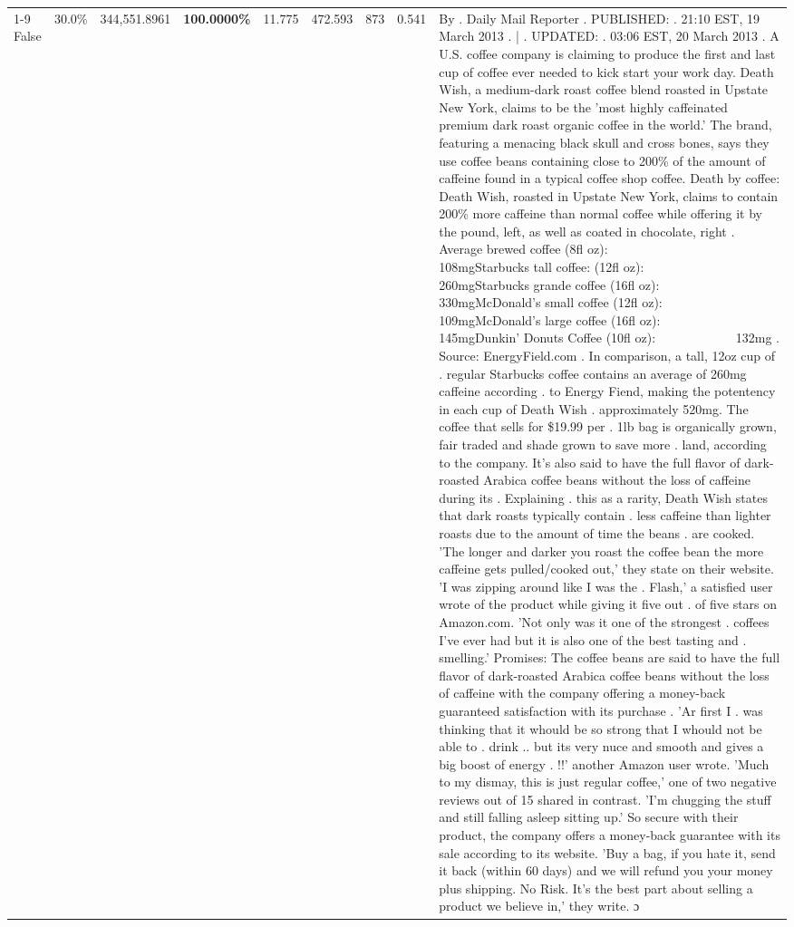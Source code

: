 \begin{table}[H]
{\begin{tabular}{lllrlllll}
\cline{1-9}
False & 30.0\% & 344,551.8961 & \bfseries \color{red} 100.0000\% & 11.775 & 472.593 & 873 & 0.541 & By . Daily Mail Reporter . PUBLISHED: . 21:10 EST, 19 March 2013 . | . UPDATED: . 03:06 EST, 20 March 2013 . A U.S. coffee company is claiming to produce the first and last cup of coffee ever needed to kick start your work day. Death Wish, a medium-dark roast coffee blend roasted in Upstate New York, claims to be the 'most highly caffeinated premium dark roast organic coffee in the world.' The brand, featuring a menacing black skull and cross bones, says they use coffee beans containing close to 200\% of the amount of caffeine found in a typical coffee shop coffee. Death by coffee: Death Wish, roasted in Upstate New York, claims to contain 200\% more caffeine than normal coffee while offering it by the pound, left, as well as coated in chocolate, right . Average brewed coffee (8fl oz):              108mgStarbucks tall coffee: (12fl oz):                260mgStarbucks grande coffee (16fl oz):         330mgMcDonald's small coffee (12fl oz):           109mgMcDonald's large coffee (16fl oz):           145mgDunkin' Donuts Coffee (10fl oz):             132mg . Source: EnergyField.com . In comparison, a tall, 12oz cup of . regular Starbucks coffee contains an average of 260mg caffeine according . to Energy Fiend, making the potentency in each cup of Death Wish . approximately 520mg. The coffee that sells for \$19.99 per . 1lb bag is organically grown, fair traded and shade grown to save more . land, according to the company. It's also said to have the full flavor of dark-roasted Arabica coffee beans without the loss of caffeine during its . Explaining . this as a rarity, Death Wish states that dark roasts typically contain . less caffeine than lighter roasts due to the amount of time the beans . are cooked. 'The longer and darker you roast the coffee bean the more caffeine gets pulled/cooked out,' they state on their website. 'I was zipping around like I was the . Flash,' a satisfied user wrote of the product while giving it five out . of five stars on Amazon.com. 'Not only was it one of the strongest . coffees I've ever had but it is also one of the best tasting and . smelling.’ Promises: The coffee beans are said to have the full flavor of dark-roasted Arabica coffee beans without the loss of caffeine with the company offering a money-back guaranteed satisfaction with its purchase . 'Ar first I . was thinking that it whould be so strong that I whould not be able to . drink .. but its very nuce and smooth and gives a big boost of energy . !!' another Amazon user wrote. 'Much to my dismay, this is just regular coffee,' one of two negative reviews out of 15 shared in contrast. 'I'm chugging the stuff and still falling asleep sitting up.' So secure with their product, the company offers a money-back guarantee with its sale according to its website. 'Buy a bag, if you hate it, send it back (within 60 days) and we will refund you your money plus shipping. No Risk. It’s the best part about selling a product we believe in,' they write. ɔ \\

\end{tabular}}
\end{table}

